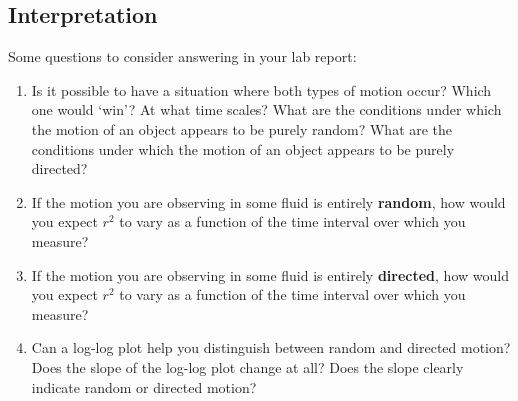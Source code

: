 \subsection*{Interpretation}
Some questions to consider answering in your lab report:
\begin{enumerate}
\item Is it possible to have a situation where both types of motion occur? Which one would ‘win'? At what time scales? What are the conditions under which the motion of an object appears to be purely random? What are the conditions under which the motion of an object appears to be purely directed? 
\item If the motion you are observing in some fluid is entirely \textbf{random}, how would you expect $r^{2}$ to vary as a function of the time interval over which you measure?
\item If the motion you are observing in some fluid is entirely \textbf{directed}, how would you expect $r^{2}$ to vary as a function of the time interval over which you measure? 
\item Can a log-log plot help you distinguish between random and directed motion? Does the slope of the log-log plot change at all? Does the slope clearly indicate random or directed motion? 
\end{enumerate}
%
%
